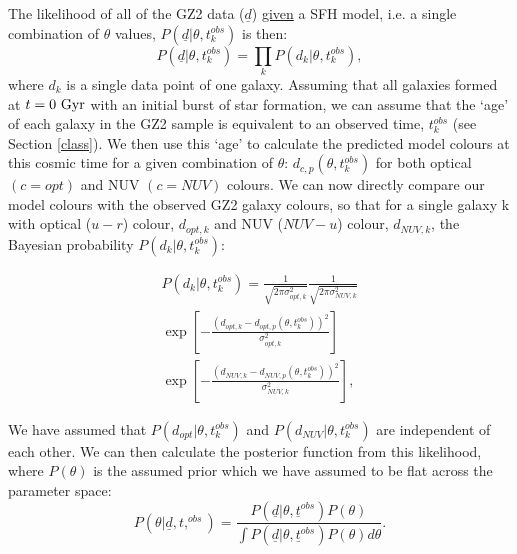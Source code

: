 \documentclass{mn2e}
\begin{document}
The likelihood of all of the GZ2 data ($\underline{d}$) \underline{given} a SFH model, i.e. a single combination of $\theta$ values, $P(\underline{d}|\theta, t_{k}^{obs})$ is then:
\begin{equation}
P(\underline{d}|\theta, t_{k}^{obs}) = \prod_{k} P(d_{k}|\theta, t_{k}^{obs}),
\end{equation}
where $d_{k}$ is a single data point of one galaxy. Assuming that all galaxies formed at $t=0~\rm{Gyr}$ with an initial burst of star formation, we can assume that the `age' of each galaxy in the GZ2 sample is equivalent to an observed time, $t^{obs}_{k}$ (see Section \ref{class}). We then use this  `age' to calculate the predicted model colours at this cosmic time for a given combination of $\theta$: $d_{c,p}(\theta, t^{obs}_{k})$ for both optical $(c=opt)$ and NUV $(c=NUV)$ colours. We can now directly compare our model colours with the observed GZ2 galaxy colours, so that for a single galaxy k with optical ($u-r$) colour, $d_{opt, k}$ and NUV ($NUV-u$) colour, $d_{NUV,k}$, the Bayesian probability $P(d_{k}|\theta, t^{obs}_{k})$:


\begin{multline}\label{like}
P(d_{k}|\theta, t^{obs}_{k}) = \frac{1}{\sqrt{2\pi\sigma_{opt, k}^2}}\frac{1}{\sqrt{2\pi\sigma_{NUV, k}^2}} \\ \exp{\left[ - \frac{(d_{opt, k} - d_{opt, p}(\theta, t_{k}^{obs}))^2}{\sigma_{opt, k}^2} \right]} \\ \exp{\left[ - \frac{(d_{NUV, k} - d_{NUV, p}(\theta, t_{k}^{obs}))^2}{\sigma_{NUV, k}^2} \right]},
\end{multline}

We have assumed that $P(d_{opt}|\theta, t^{obs}_{k})$ and $P(d_{NUV}|\theta, t^{obs}_{k})$ are independent of each other.
%
We can then calculate the posterior function from this likelihood, where $P(\theta)$ is the assumed prior which we have assumed to be flat across the parameter space:
\begin{equation}\label{big}
P(\theta|\underline{d}, t,^{obs}) = \frac{P(\underline{d}|\theta, \underline{t}^{obs})P(\theta)}{\int P(\underline{d}|\theta, \underline{t}^{obs})P(\theta) d\theta}.
\end{equation}
\end{document}
